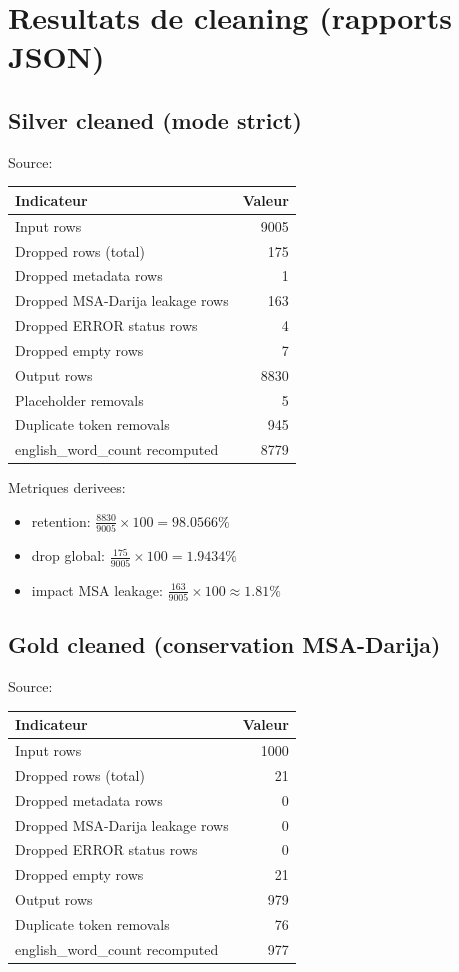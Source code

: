 \documentclass[11pt,a4paper]{article}
\begin{document}
\section{Resultats de cleaning (rapports JSON)}
\subsection{Silver cleaned (mode strict)}
Source: 

\begin{center}
\begin{tabular}{lr}
\toprule
Indicateur & Valeur \\
\midrule
Input rows & 9005 \\
Dropped rows (total) & 175 \\
Dropped metadata rows & 1 \\
Dropped MSA-Darija leakage rows & 163 \\
Dropped ERROR status rows & 4 \\
Dropped empty rows & 7 \\
Output rows & 8830 \\
Placeholder removals & 5 \\
Duplicate token removals & 945 \\
english\_word\_count recomputed & 8779 \\
\bottomrule
\end{tabular}
\end{center}

\noindent Metriques derivees:
\begin{itemize}[leftmargin=*]
  \item retention: $\frac{8830}{9005}\times 100 = 98.0566\%$
  \item drop global: $\frac{175}{9005}\times 100 = 1.9434\%$
  \item impact MSA leakage: $\frac{163}{9005}\times 100 \approx 1.81\%$
\end{itemize}

\subsection{Gold cleaned (conservation MSA-Darija)}
Source: 

\begin{center}
\begin{tabular}{lr}
\toprule
Indicateur & Valeur \\
\midrule
Input rows & 1000 \\
Dropped rows (total) & 21 \\
Dropped metadata rows & 0 \\
Dropped MSA-Darija leakage rows & 0 \\
Dropped ERROR status rows & 0 \\
Dropped empty rows & 21 \\
Output rows & 979 \\
Duplicate token removals & 76 \\
english\_word\_count recomputed & 977 \\
\bottomrule
\end{tabular}
\end{center}
\end{document}
